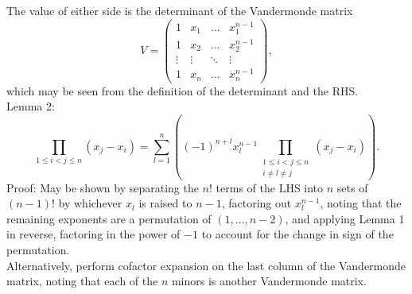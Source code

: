 \documentclass{article}
\begin{document}
The value of either side is the determinant of the Vandermonde matrix
\[
V=
\begin{pmatrix}
  1 & x_1 & \ldots & x_1^{n-1} \\
  1 & x_2 & \ldots & x_2^{n-1} \\
  \vdots & \vdots & \ddots & \vdots \\
  1 & x_n & \ldots & x_n^{n-1}
\end{pmatrix},
\]
which may be seen from the definition of the determinant and the RHS. \\

Lemma 2:
\[\prod_{1 \leq i < j \leq n} (x_j-x_i)
= \sum_{l=1}^n\left((-1)^{n+l}x_l^{n-1}\prod_{\substack{1 \leq i < j \leq n \\ i \neq l \neq j}}(x_j-x_i)\right).\]
Proof: May be shown by separating the $n!$ terms of the LHS into $n$ sets of $(n-1)!$
by whichever $x_l$ is raised to $n-1$, factoring out $x_l^{n-1}$,
noting that the remaining exponents are a permutation of $(1, \ldots, n-2)$,
and applying Lemma 1 in reverse,
factoring in the power of $-1$ to account for the change in sign of the permutation. \\
Alternatively, perform cofactor expansion on the last column of the Vandermonde matrix,
noting that each of the $n$ minors is another Vandermonde matrix. \\
\end{document}
